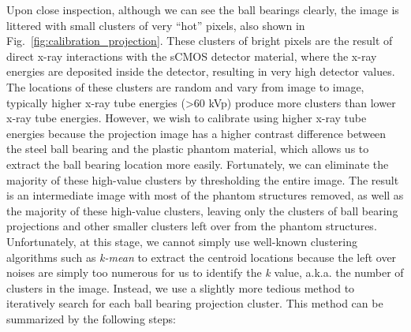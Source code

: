 Upon close inspection, although we can see the ball bearings clearly, the image is littered with small clusters of very ``hot'' pixels, also shown in Fig.~\ref{fig:calibration_projection}.  These clusters of bright pixels are the result of direct x-ray interactions with the sCMOS detector material, where the x-ray energies are deposited inside the detector, resulting in very high detector values.  The locations of these clusters are random and vary from image to image, typically higher x-ray tube energies (>60 kVp) produce more clusters than lower x-ray tube energies.  However, we wish to calibrate using higher x-ray tube energies because the projection image has a higher contrast difference between the steel ball bearing and the plastic phantom material, which allows us to extract the ball bearing location more easily.  Fortunately, we can eliminate the majority of these high-value clusters by thresholding the entire image.  The result is an intermediate image with most of the phantom structures removed, as well as the majority of these high-value clusters, leaving only the clusters of ball bearing projections and other smaller clusters left over from the phantom structures.  Unfortunately, at this stage, we cannot simply use well-known clustering algorithms such as \textit{k-mean} to extract the centroid locations because the left over noises are simply too numerous for us to identify the \textit{k} value, a.k.a. the number of clusters in the image.  Instead, we use a slightly more tedious method to iteratively search for each ball bearing projection cluster.  This method can be summarized by the following steps:
%
